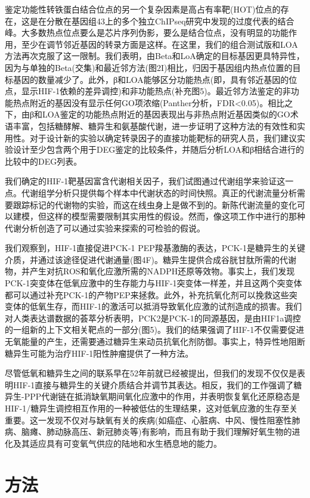 \documentclass{ctexart}
\begin{document}
    鉴定功能性转铁蛋白结合位点的另一个复杂因素是高占有率靶(HOT)位点的存在，这是在分散在基因组43上的多个独立ChIPseq研究中发现的过度代表的结合峰。大多数热点位点要么是芯片序列伪影，要么是结合位点，没有明显的功能作用，至少在调节邻近基因的转录方面是这样。在这里，我们的组合测试版和LOA方法再次克服了这一限制。我们表明，由Beta和LoA确定的目标基因更具特异性，因为与单独的Beta(交集)和最近邻方法(图2I)相比，归因于基因组内热点位置的目标基因的数量减少了。此外，β和LOA能够区分功能热点(即，具有邻近基因的位点，显示HIF-1依赖的差异调控)和非功能热点(补充图5)。最近邻方法鉴定的非功能热点附近的基因没有显示任何GO项浓缩(Panther分析，FDR<0.05)。相比之下，由β和LOA鉴定的功能热点附近的基因表现出与非热点附近基因类似的GO术语丰富，包括糖酵解、糖异生和氨基酸代谢，进一步证明了这种方法的有效性和实用性。对于设计新的实验以确定转录因子的直接功能靶标的研究人员，我们建议实验设计至少包含两个用于DEG鉴定的比较条件，并随后分析LOA和β相结合进行的比较中的DEG列表。

    我们确定的HIF-1靶基因富含代谢相关因子，我们试图通过代谢组学来验证这一点。代谢组学分析只提供每个样本中代谢状态的时间快照。真正的代谢流量分析需要跟踪标记的代谢物的实验，而这在线虫身上是做不到的。新陈代谢流量的变化可以建模，但这样的模型需要限制其实用性的假设。然而，像这项工作中进行的那种代谢分析创造了可以通过实验来探索的可检验的假说。

    我们观察到，HIF-1直接促进PCK-1 PEP羧基激酶的表达，PCK-1是糖异生的关键介质，并通过该途径促进代谢通量(图4F)。糖异生提供合成谷胱甘肽所需的代谢物，并产生对抗ROS和氧化应激所需的NADPH还原等效物。事实上，我们发现PCK-1突变体在低氧应激中的生存能力与HIF-1突变体一样差，并且这两个突变体都可以通过补充PCK-1的产物PEP来拯救。此外，补充抗氧化剂可以挽救这些突变体的低氧生存，而HIF-1的激活可以抵消导致氧化应激的试剂造成的损害。我们对人类表达谱数据的荟萃分析表明，PCK2是PCK-1的同源基因，是由HIF1a调控的一组新的上下文相关靶点的一部分(图5)。我们的结果强调了HIF-1不仅需要促进无氧能量的产生，还需要通过糖异生来动员抗氧化剂防御。事实上，特异性地阻断糖异生可能为治疗HIF-1阳性肿瘤提供了一种方法。

    尽管低氧和糖异生之间的联系早在52年前就已经被提出，但我们的发现不仅仅是表明HIF-1直接与糖异生的关键介质结合并调节其表达。相反，我们的工作强调了糖异生-PPP代谢链在抵消缺氧期间氧化应激中的作用，并表明恢复氧化还原稳态是HIF-1/糖异生调控相互作用的一种被低估的生理结果，这对低氧应激的生存至关重要。这一发现不仅对与缺氧有关的疾病(如癌症、心脏病、中风、慢性阻塞性肺病、脑瘫、肺动脉高压、新冠肺炎等)有影响，而且有助于我们理解好氧生物的进化及其适应具有可变氧气供应的陆地和水生栖息地的能力。

    \section{方法}
\end{document}
